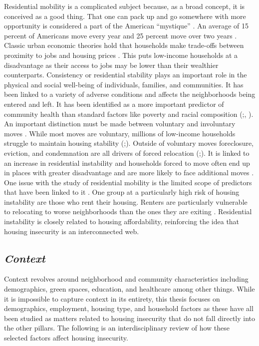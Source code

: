 Residential mobility is a complicated subject because, as a broad concept, it is conceived as a good thing. That one can pack up and go somewhere with more opportunity is considered a part of the American “mystique” \citep{molloy_internal_2011}. An average of 15 percent of Americans move every year and 25 percent move over two years \citep{bachmann_ins_2014}. Classic urban economic theories hold that households make trade-offs between proximity to jobs and housing prices \citep{hu_housing_2019}. This puts low-income households at a disadvantage as their access to jobs may be lower than their wealthier counterparts. Consistency or residential stability plays an important role in the physical and social well-being of individuals, families, and communities. It has been linked to a variety of adverse conditions and affects the neighborhoods being entered and left. It has been identified as a more important predictor of community health than standard factors like poverty and racial composition (\citealp{desmond_forced_2015};\citealp{desmond_housing_2016}, \citealp{rauh_housing_2008}). An important distinction must be made between voluntary and involuntary moves \citep{siskar_who_2019}. While most moves are voluntary, millions of low-income households struggle to maintain housing stability (\citealp{phinney_exploring_2013};\citealp{kang_why_2019}). Outside of voluntary moves foreclosure, eviction, and condemnation are all drivers of forced relocation (\citealp{phinney_exploring_2013};\citealp{siskar_who_2019}). It is linked to an increase in residential instability and households forced to move often end up in places with greater disadvantage and are more likely to face additional moves \citep{desmond_forced_shell_2015}. One issue with the study of residential mobility is the limited scope of predictors that have been linked to it \citep{kang_why_2019}. One group at a particularly high risk of housing instability are those who rent their housing. Renters are particularly vulnerable to relocating to worse neighborhoods than the ones they are exiting \citep{desmond_forced_2015}. Residential instability is closely related to housing affordability, reinforcing the idea that housing insecurity is an interconnected web.

\subsection{\textit{Context}}

Context revolves around neighborhood and community characteristics including demographics, green spaces, education, and healthcare among other things. While it is impossible to capture context in its entirety, this thesis focuses on demographics, employment, housing type, and household factors as these have all been studied as matters related to housing insecurity that do not fall directly into the other pillars. The following is an interdisciplinary review of how these selected factors affect housing insecurity.  

